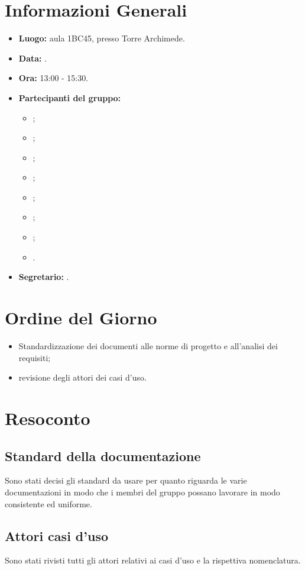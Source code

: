 \section{Informazioni Generali}
\begin{itemize}
\item \textbf{Luogo:} aula 1BC45, presso Torre Archimede.
\item \textbf{Data:} \Data.
\item \textbf{Ora:} 13:00 - 15:30.
\item \textbf{Partecipanti del gruppo:}
	\begin{itemize}
		\item \AT{}; 
		\item \BR{};
		\item \CE{}; 
		\item \DF{};
		\item \LD{};
		\item \MC{};
		\item \PF{};
		\item \SE{}.
	\end{itemize} 
\item \textbf{Segretario:} \BR{}.
\end{itemize}

\section{Ordine del Giorno}
\begin{itemize}
	\item Standardizzazione dei documenti alle norme di progetto e all'analisi dei requisiti;
	\item revisione degli attori dei casi d'uso.
\end{itemize}


\section{Resoconto}
\subsection{Standard della documentazione}
Sono stati decisi gli standard da usare per quanto riguarda le varie documentazioni in modo che i membri del gruppo possano lavorare in modo consistente ed uniforme.\\

\subsection{Attori casi d'uso}
Sono stati rivisti tutti gli attori relativi ai casi d'uso e la rispettiva nomenclatura.\\

\clearpage